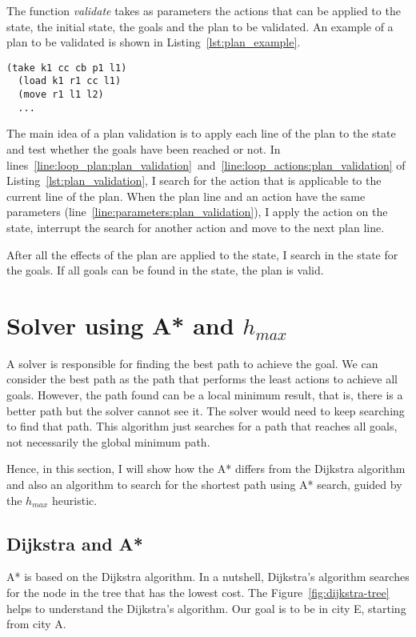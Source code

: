 \documentclass[letterpaper]{article}
\begin{document}
The function \textit{validate} takes as parameters the actions that can be applied to the state, the initial state, the goals and the plan to be validated. An example of a plan to be validated is shown in Listing~\ref{lst:plan_example}.

\begin{lstlisting}[label=lst:plan_example, caption={Example of a plan}, captionpos=b]
  (take k1 cc cb p1 l1)
  (load k1 r1 cc l1)
  (move r1 l1 l2)
  ...
\end{lstlisting}

The main idea of a plan validation is to apply each line of the plan to the state and test whether the goals have been reached or not. In lines~\ref{line:loop_plan:plan_validation}~and~\ref{line:loop_actions:plan_validation} of Listing~\ref{lst:plan_validation}, I search for the action that is applicable to the current line of the plan. When the plan line and an action have the same parameters (line~\ref{line:parameters:plan_validation}), I apply the action on the state, interrupt the search for another action and move to the next plan line.

After all the effects of the plan are applied to the state, I search in the state for the goals. If all goals can be found in the state, the plan is valid.


\section{Solver using A* and $h_{max}$}

A solver is responsible for finding the best path to achieve the goal. We can consider the best path as the path that performs the least actions to achieve all goals. However, the path found can be a local minimum result, that is, there is a better path but the solver cannot see it. The solver would need to keep searching to find that path. This algorithm just searches for a path that reaches all goals, not necessarily the global minimum path.

Hence, in this section, I will show how the A* differs from the Dijkstra algorithm and also an algorithm to search for the shortest path using A* search, guided by the $h_{max}$ heuristic.

\subsection{Dijkstra and A*}

A* is based on the Dijkstra algorithm. In a nutshell, Dijkstra's algorithm searches for the node in the tree that has the lowest cost. The Figure~\ref{fig:dijkstra-tree} helps to understand the Dijkstra's algorithm. Our goal is to be in city E, starting from city A.
\end{document}
